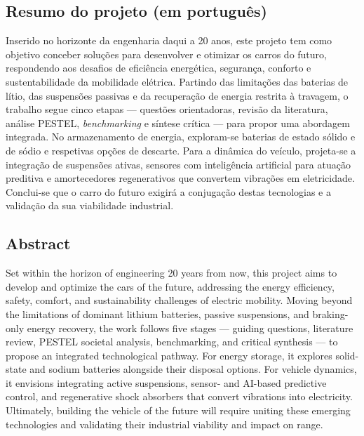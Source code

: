 
\subsection{Resumo do projeto (em português)}
\begin{campotexto}
Inserido no horizonte da engenharia daqui a 20 anos, este projeto tem como objetivo conceber soluções para desenvolver e otimizar os carros do futuro, respondendo aos desafios de eficiência energética, segurança, conforto e sustentabilidade da mobilidade elétrica. Partindo das limitações das baterias de lítio, das suspensões passivas e da recuperação de energia restrita à travagem, o trabalho segue cinco etapas — questões orientadoras, revisão da literatura, análise PESTEL, \textit{benchmarking} e síntese crítica — para propor uma abordagem integrada. No armazenamento de energia, exploram-se baterias de estado sólido e de sódio e respetivas opções de descarte. Para a dinâmica do veículo, projeta-se a integração de suspensões ativas, sensores com inteligência artificial para atuação preditiva e amortecedores regenerativos que convertem vibrações em eletricidade. Conclui-se que o carro do futuro exigirá a conjugação destas tecnologias e a validação da sua viabilidade industrial.
\end{campotexto}

\subsection{Abstract}
\begin{campotexto}
Set within the horizon of engineering 20 years from now, this project aims to develop and optimize the cars of the future, addressing the energy efficiency, safety, comfort, and sustainability challenges of electric mobility. Moving beyond the limitations of dominant lithium batteries, passive suspensions, and braking-only energy recovery, the work follows five stages — guiding questions, literature review, PESTEL societal analysis, benchmarking, and critical synthesis — to propose an integrated technological pathway. For energy storage, it explores solid-state and sodium batteries alongside their disposal options. For vehicle dynamics, it envisions integrating active suspensions, sensor- and AI-based predictive control, and regenerative shock absorbers that convert vibrations into electricity. Ultimately, building the vehicle of the future will require uniting these emerging technologies and validating their industrial viability and impact on range.
\end{campotexto}

